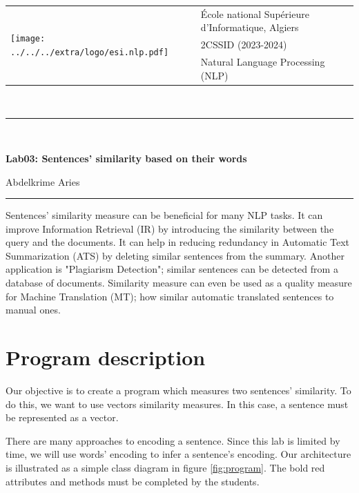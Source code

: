 \documentclass[11pt, a4paper]{article}
\begin{document}
	
	
	\pagestyle{fancy}
	
	\noindent
	\begin{tabular}{ll}
		\multirow{3}{*}{\texttt{[image: ../../../extra/logo/esi.nlp.pdf]}} & \'Ecole national Supérieure d'Informatique, Algiers\\
		& 2CSSID (2023-2024)\\
		& Natural Language Processing (NLP)
	\end{tabular}\\[.25cm]
	\noindent\rule{\textwidth}{1pt}\\[-0.25cm]
	\begin{center}
		{\LARGE \textbf{Lab03: Sentences' similarity based on their words}}
		\begin{flushright}
			Abdelkrime Aries
		\end{flushright}
	\end{center}\vspace*{-0.25cm}
	\noindent\rule{\textwidth}{1pt}

Sentences' similarity measure can be beneficial for many NLP tasks.
It can improve Information Retrieval (IR) by introducing the similarity between the query and the documents.
It can help in reducing redundancy in Automatic Text Summarization (ATS) by deleting similar sentences from the summary.
Another application is "Plagiarism Detection"; similar sentences can be detected from a database of documents.
Similarity measure can even be used as a quality measure for Machine Translation (MT); how similar automatic translated sentences to manual ones.

\section{Program description}

Our objective is to create a program which measures two sentences' similarity.
To do this, we want to use vectors similarity measures.
In this case, a sentence must be represented as a vector.

There are many approaches to encoding a sentence.
Since this lab is limited by time, we will use words' encoding to infer a sentence's encoding.
Our architecture is illustrated as a simple class diagram in figure \ref{fig:program}.
The bold red attributes and methods must be completed by the students. 
\end{document}

